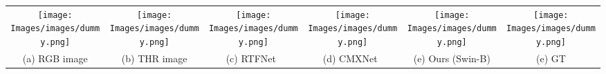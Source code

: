 \documentclass[10pt,twocolumn,letterpaper]{article}
\begin{document}
\begin{figure*}[t]
\begin{center}
{\begin{tabular}{c@{\hskip 0.005\linewidth}c@{\hskip 0.005\linewidth}c@{\hskip 0.005\linewidth}c@{\hskip 0.005\linewidth}c@{\hskip 0.005\linewidth}c}
\texttt{[image: Images/images/dummy.png]} & \texttt{[image: Images/images/dummy.png]} & 
\texttt{[image: Images/images/dummy.png]} & \texttt{[image: Images/images/dummy.png]} & 
\texttt{[image: Images/images/dummy.png]} & \texttt{[image: Images/images/dummy.png]} \vspace{-0.1in} \\ 
{\footnotesize (a) RGB image} & {\footnotesize (b) THR image} & {\footnotesize (c) RTFNet~\cite{sun2019rtfnet}} & {\footnotesize (d) CMXNet~\cite{liu2022cmx}} &  {\footnotesize (e) Ours (Swin-B)} &  {\footnotesize (e) GT}  \\ 
\end{tabular}
}
\end{center}
\vspace{-0.2in}
\caption{{\bf Qualitative comparison for semantic segmentation of RGB-T images on MF~\cite{ha2017mfnet} dataset.}}
\label{fig:supple_mf}
\vspace{-0.2in}
\end{figure*}
\end{document}
